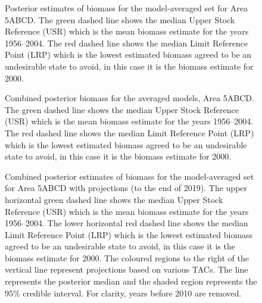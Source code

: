\documentclass[11pt]{book}
\begin{document}
\begin{figure}[htb]

{\centering {} 

}

\caption{Posterior estimates of biomass for the model-averaged set for Area 5ABCD. The green dashed line shows the median Upper Stock Reference (USR) which is the mean biomass estimate for the years 1956--2004. The red dashed line shows the median Limit Reference Point (LRP) which is the lowest estimated biomass agreed to be an undesirable state to avoid, in this case it is the biomass estimate for 2000.}\label{fig:summary-fig-model-average-biomass-comp-5abcd}
\end{figure}
\begin{figure}[htb]

{\centering {} 

}

\caption{Combined posterior biomass for the averaged models, Area 5ABCD. The green dashed line shows the median Upper Stock Reference (USR) which is the mean biomass estimate for the years 1956--2004. The red dashed line shows the median Limit Reference Point (LRP) which is the lowest estimated biomass agreed to be an undesirable state to avoid, in this case it is the biomass estimate for 2000.}\label{fig:summary-fig-model-average-biomass-5abcd}
\end{figure}
\clearpage
\begin{figure}[htb]

{\centering {} 

}

\caption{Combined posterior estimates of biomass for the model-averaged set for Area 5ABCD with projections (to the end of 2019).  The upper horizontal green dashed line shows the median Upper Stock Reference (USR) which is the mean biomass estimate for the years 1956--2004. The lower horizontal red dashed line shows the median Limit Reference Point (LRP) which is the lowest estimated biomass agreed to be an undesirable state to avoid, in this case it is the biomass estimate for 2000. The coloured regions to the right of the vertical line represent projections based on various TACs. The line represents the posterior median and the shaded region represents the 95\% credible interval. For clarity, years before 2010 are removed.}\label{fig:summary-fig-model-average-biomass-5abcd-proj}
\end{figure}
\end{document}
